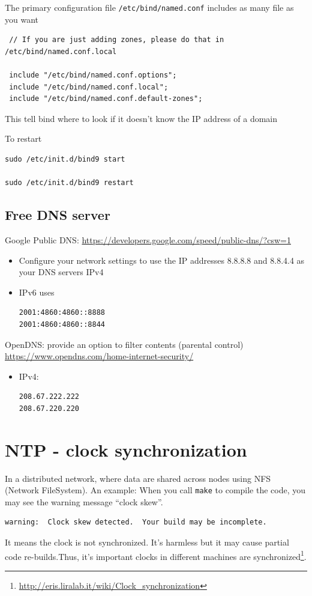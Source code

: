  The primary configuration file \verb!/etc/bind/named.conf! includes as many
 file as you want
 \begin{verbatim}
 // If you are just adding zones, please do that in /etc/bind/named.conf.local
 
 include "/etc/bind/named.conf.options";
 include "/etc/bind/named.conf.local";
 include "/etc/bind/named.conf.default-zones";
 \end{verbatim}
 
This tell bind where to look if it doesn't know the IP address of a domain

To restart
\begin{verbatim}
sudo /etc/init.d/bind9 start

sudo /etc/init.d/bind9 restart
\end{verbatim}



\subsection{Free DNS server}

Google Public DNS: \url{https://developers.google.com/speed/public-dns/?csw=1}
\begin{itemize}
  \item Configure your network settings to use the IP addresses 8.8.8.8 and
  8.8.4.4 as your DNS servers IPv4
  
  \item IPv6 uses
\begin{verbatim}
2001:4860:4860::8888
2001:4860:4860::8844
\end{verbatim}
\end{itemize}

OpenDNS: provide an option
to filter contents
(parental control) \url{https://www.opendns.com/home-internet-security/}
\begin{itemize}
  \item IPv4:
\begin{verbatim}
208.67.222.222
208.67.220.220
\end{verbatim}
\end{itemize}


\section{NTP - clock synchronization}
\label{sec:NTP}

In a distributed network, where data are shared across nodes using NFS (Network
FileSystem).  An example: When you call \verb!make! to compile the code, you may
see the warning message ``clock skew''.
\begin{verbatim}
warning:  Clock skew detected.  Your build may be incomplete.
\end{verbatim}
It means the clock is not synchronized. It's harmless but it may cause partial
code re-builds.Thus, it's important clocks in different machines are
synchronized\footnote{\url{http://eris.liralab.it/wiki/Clock_synchronization}}. 


